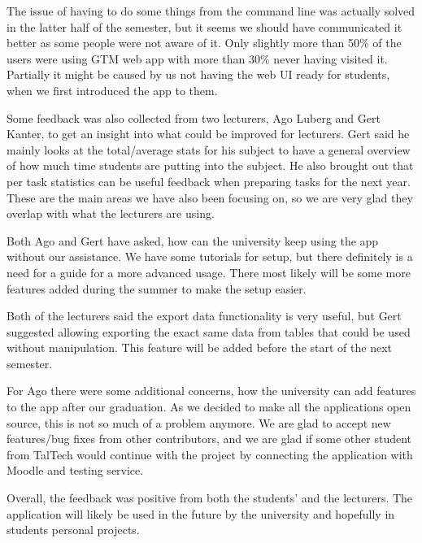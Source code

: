 The issue of having to do some things from the command line was actually solved in the latter half of the semester, but it seems
we should have communicated it better as some people were not aware of it.
Only slightly more than 50\% of the users were using GTM web app with more than 30\% never having visited it.
Partially it might be caused by us not having the web UI ready for students, when we first introduced the app to them.

Some feedback was also collected from two lecturers, Ago Luberg and Gert Kanter, to get an insight into what could be improved for lecturers.
Gert said he mainly looks at the total/average stats for his subject to have a general overview of how much time students are
putting into the subject.
He also brought out that per task statistics can be useful feedback when preparing tasks for the next year.
These are the main areas we have also been focusing on, so we are very glad they overlap with what the lecturers are using.

Both Ago and Gert have asked, how can the university keep using the app without our assistance.
We have some tutorials for setup, but there definitely is a need for a guide for a more advanced usage.
There most likely will be some more features added during the summer to make the setup easier.

Both of the lecturers said the export data functionality is very useful, but Gert suggested allowing
exporting the exact same data from tables that could be used without manipulation.
This feature will be added before the start of the next semester.

For Ago there were some additional concerns, how the university can add features to the app after our graduation.
As we decided to make all the applications open source, this is not so much of a problem anymore.
We are glad to accept new features/bug fixes from other contributors, and we are glad if some other student from TalTech
would continue with the project by connecting the application with Moodle and testing service.

Overall, the feedback was positive from both the students' and the lecturers.
The application will likely be used in the future by the university and hopefully in students personal projects.
